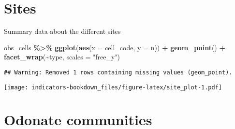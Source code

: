 \documentclass[
]{book}
\newenvironment{Shaded}{\begin{snugshade}}{\end{snugshade}}
\newcommand{\CommentTok}[1]{\textcolor[rgb]{0.56,0.35,0.01}{\textit{#1}}}
\newcommand{\DataTypeTok}[1]{\textcolor[rgb]{0.13,0.29,0.53}{#1}}
\newcommand{\KeywordTok}[1]{\textcolor[rgb]{0.13,0.29,0.53}{\textbf{#1}}}
\newcommand{\NormalTok}[1]{#1}
\newcommand{\OperatorTok}[1]{\textcolor[rgb]{0.81,0.36,0.00}{\textbf{#1}}}
\newcommand{\StringTok}[1]{\textcolor[rgb]{0.31,0.60,0.02}{#1}}
\begin{document}
\hypertarget{sites}{%
\chapter{Sites}\label{sites}}

Summary data about the different sites

\begin{Shaded}
\begin{Highlighting}[]
\NormalTok{obs\_cells }\OperatorTok{\%\textgreater{}\%}\StringTok{ }
\StringTok{  }\KeywordTok{ggplot}\NormalTok{(}\KeywordTok{aes}\NormalTok{(}\DataTypeTok{x =}\NormalTok{ cell\_code, }\DataTypeTok{y =}\NormalTok{ n)) }\OperatorTok{+}\StringTok{ }\KeywordTok{geom\_point}\NormalTok{() }\OperatorTok{+}\StringTok{ }
\StringTok{  }\KeywordTok{facet\_wrap}\NormalTok{(}\OperatorTok{\textasciitilde{}}\NormalTok{type, }\DataTypeTok{scales =} \StringTok{"free\_y"}\NormalTok{)}
\end{Highlighting}
\end{Shaded}

\begin{verbatim}
## Warning: Removed 1 rows containing missing values (geom_point).
\end{verbatim}

\texttt{[image: indicators-bookdown\_files/figure-latex/site\_plot-1.pdf]}

\hypertarget{odonate-communities}{%
\chapter{Odonate communities}\label{odonate-communities}}

\begin{Shaded}
\end{Shaded}
\end{document}
